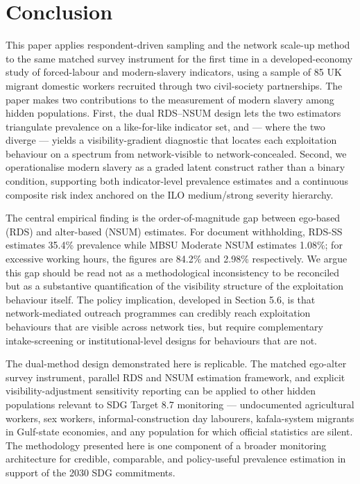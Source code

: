 \documentclass[
  12pt,
  letterpaper,
  DIV=11,
  numbers=noendperiod]{scrartcl}
\begin{document}
\section{Conclusion}\label{conclusion}

This paper applies respondent-driven sampling and the network scale-up
method to the same matched survey instrument for the first time in a
developed-economy study of forced-labour and modern-slavery indicators,
using a sample of 85 UK migrant domestic workers recruited through two
civil-society partnerships. The paper makes two contributions to the
measurement of modern slavery among hidden populations. First, the dual
RDS--NSUM design lets the two estimators triangulate prevalence on a
like-for-like indicator set, and --- where the two diverge --- yields a
visibility-gradient diagnostic that locates each exploitation behaviour
on a spectrum from network-visible to network-concealed. Second, we
operationalise modern slavery as a graded latent construct rather than a
binary condition, supporting both indicator-level prevalence estimates
and a continuous composite risk index anchored on the ILO medium/strong
severity hierarchy.

The central empirical finding is the order-of-magnitude gap between
ego-based (RDS) and alter-based (NSUM) estimates. For document
withholding, RDS-SS estimates 35.4\% prevalence while MBSU Moderate NSUM
estimates 1.08\%; for excessive working hours, the figures are 84.2\%
and 2.98\% respectively. We argue this gap should be read not as a
methodological inconsistency to be reconciled but as a substantive
quantification of the visibility structure of the exploitation behaviour
itself. The policy implication, developed in Section 5.6, is that
network-mediated outreach programmes can credibly reach exploitation
behaviours that are visible across network ties, but require
complementary intake-screening or institutional-level designs for
behaviours that are not.

The dual-method design demonstrated here is replicable. The matched
ego-alter survey instrument, parallel RDS and NSUM estimation framework,
and explicit visibility-adjustment sensitivity reporting can be applied
to other hidden populations relevant to SDG Target 8.7 monitoring ---
undocumented agricultural workers, sex workers, informal-construction
day labourers, kafala-system migrants in Gulf-state economies, and any
population for which official statistics are silent. The methodology
presented here is one component of a broader monitoring architecture for
credible, comparable, and policy-useful prevalence estimation in support
of the 2030 SDG commitments.
\end{document}
